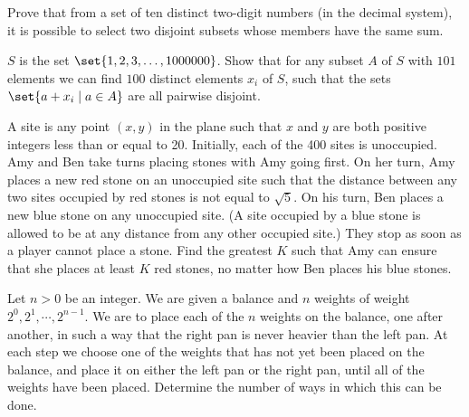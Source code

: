 



\renewcommand{\theenumi}{\alph{enumi}}



\noindent
 
\filbreak

\begin{problem}
Prove that from a set of ten distinct two-digit numbers (in the decimal system), it is possible to select two disjoint subsets whose members have the same sum.

\end{problem}

\begin{problem}
$S$ is the set $\set{1, 2, 3, \dots ,1000000}$. Show that for any subset $A$ of $S$ with $101$ elements we can find $100$ distinct elements $x_i$ of $S$, such that the sets $\set{a + x_i \mid a \in A}$ are all pairwise disjoint.

\end{problem}


\begin{problem}
A site is any point $(x, y)$ in the plane such that $x$ and $y$ are both positive integers less than or equal to 20. Initially, each of the 400 sites is unoccupied. Amy and Ben take turns placing stones with Amy going first. On her turn, Amy places a new red stone on an unoccupied site such that the distance between any two sites occupied by red stones is not equal to $\sqrt{5}$. On his turn, Ben places a new blue stone on any unoccupied site. (A site occupied by a blue stone is allowed to be at any distance from any other occupied site.) They stop as soon as a player cannot place a stone. Find the greatest $K$ such that Amy can ensure that she places at least $K$ red stones, no matter how Ben places his blue stones.

\end{problem}

\begin{problem}
Let $n > 0$ be an integer. We are given a balance and $n$ weights of weight $2^0,2^1, \cdots ,2^{n-1}$. We are to place each of the $n$ weights on the balance, one after another, in such a way that the right pan is never heavier than the left pan. At each step we choose one of the weights that has not yet been placed on the balance, and place it on either the left pan or the right pan, until all of the weights have been placed. Determine the number of ways in which this can be done.

\end{problem}

